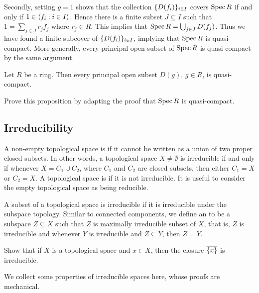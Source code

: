 Secondly, setting $g = 1$ shows that the collection $\lbrace D(f_i)\rbrace_{i \in I}$ covers $\operatorname{Spec} R$ if and only if $1 \in \langle f_i : i \in I\rangle$. Hence there is a finite subset $J \subseteq I$ such that $1 = \sum_{j \in J} r_j f_j$ where $r_j \in R$. This implies that $\operatorname{Spec} R = \bigcup_{j \in J} D(f_j)$. Thus we have found a finite subcover of $\lbrace D(f_i)\rbrace_{i \in I}$, implying that $\operatorname{Spec} R$ is quasi-compact. More generally, every principal open subset of $\operatorname{Spec} R$ is quasi-compact by the same argument.

\begin{proposition}\label{chap2:principal-open-is-quasi-compact}
	Let $R$ be a ring. Then every principal open subset $D(g)$, $g \in R$, is quasi-compact. 
\end{proposition}
\begin{exercise}
	Prove this proposition by adapting the proof that $\operatorname{Spec} R$ is quasi-compact. 
\end{exercise}

\subsection*{Irreducibility}

A non-empty topological space is  if it cannot be written as a union of two proper closed subsets. In other words, a topological space $X \neq \emptyset$ is irreducible if and only if whenever $X = C_1 \cup C_2$, where $C_1$ and $C_2$ are closed subsets, then either $C_1 = X$ or $C_2 = X$. A topological space is  if it is not irreducible. It is useful to consider the empty topological space as being reducible.

A subset of a topological space is irreducible if it is irreducible under the subspace topology. Similar to connected components, we define an  to be a subspace $Z \subseteq X$ such that $Z$ is maximally irreducible subset of $X$, that is, $Z$ is irreducible and whenever $Y$ is irreducible and $Z \subseteq Y$, then $Z = Y$.

\begin{exercise}
	Show that if $X$ is a topological space and $x \in X$, then the closure $\overline{\lbrace x\rbrace}$ is irreducible.
\end{exercise}

We collect some properties of irreducible spaces here, whose proofs are mechanical.

